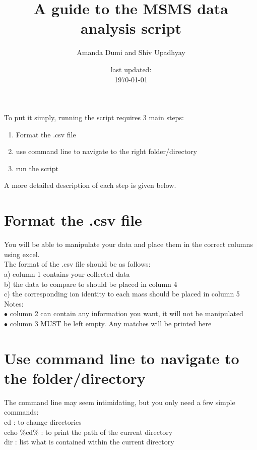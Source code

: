 \documentclass[12pt]{article}
\begin{document}
\title{ A guide to the MSMS data analysis script\vspace{-.8cm}}
\author{Amanda Dumi and Shiv Upadhyay\vspace{-1cm}}
\date{\vspace{-.5cm}\small{last updated:\\ \today}}
\maketitle
\noindent To put it simply, running the script requires 3 main steps:
\begin{enumerate}
\item Format the .csv file
\item use command line to navigate to the right folder/directory
\item run the script
\end{enumerate}


\noindent A more detailed description of each step is given below.
\section{Format the .csv file}

You will be able to manipulate your data and place them in the correct columns using excel.\\
The format of the .csv file should be as follows:\\
\indent a) column 1 contains your collected data\\
\indent b) the data to compare to should be placed in column 4\\
\indent c) the corresponding ion identity to each mass should be placed in column 5\\

\noindent Notes:\\
$\bullet$ column 2 can contain any information you want, it will not be manipulated\\
$\bullet$ column 3 MUST be left empty. Any matches will be printed here\\
\newpage
\section{Use command line to navigate to the folder/directory}
\noindent The command line may seem intimidating, but you only need a few simple commands:\\
cd : to change directories\\
echo \%cd\% :  to print the path of the current directory \\
dir : list what is contained within the current directory\\
\end{document}
